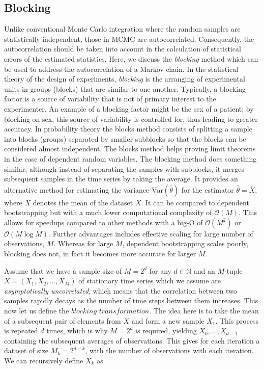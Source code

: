 \subsection{Blocking}\label{sec:blocking}

Unlike conventional Monte Carlo integration where the random samples are statistically independent, those in MCMC are autocorrelated. Consequently, the autocorrelation should be taken into account in the calculation of statistical errors of the estimated statistics. Here, we discuss the \textit{blocking} method \citep{doi:10.1063/1.457480} which can be used to address the autocorrelation of a Markov chain. In the statistical theory of the design of experiments, \textit{blocking} is the arranging of experimental units in groups (blocks) that are similar to one another. Typically, a blocking factor is a source of variability that is not of primary interest to the experimenter. An example of a blocking factor might be the sex of a patient; by blocking on sex, this source of variability is controlled for, thus leading to greater accuracy. In probability theory the blocks method consists of splitting a sample into blocks (groups) separated by smaller subblocks so that the blocks can be considered almost independent. The blocks method helps proving limit theorems in the case of dependent random variables. The blocking method does something similar, although instead of separating the samples with subblocks, it merges subsequent samples in the time series by taking the average. It provides an alternative method for estimating the variance $\text{Var}(\hat{\theta})$ for the estimator $\hat{\theta} = \overline{X}$, where $\overline{X}$ denotes the mean of the dataset $X$. It can be compared to dependent bootstrapping but with a much lower computational complexity of $\mathcal{O}(M)$. This allows for speedups compared to other methods with a big-O of $\mathcal{O}(M^2)$ or $\mathcal{O}(M \log M)$. Further advantages includes effective scaling for large number of observations,  $M$. Whereas for large $M$, dependent bootstrapping scales poorly, blocking does not, in fact it becomes more accurate for larger $M$.  

Assume that we have a sample size of $M = 2^d$ for any $d \in \mathbb{N}$ and an $M$-tuple $X = (X_1, X_2, \dots, X_M)$ of stationary time series which we assume are \textit{asymptotically uncorrelated}, which means that the correlation between two samples rapidly decays as the number of time steps between them increases. This now let us define the $\textit{blocking transformation}$. The idea here is to take the mean of a subsequent pair of elements from $X$ and form a new sample $X_1$. This process is repeated $d$ times, which is why $M=2^d$ is required, yielding $X_0, \dots, X_{d-1}$ containing the subsequent averages of observations. This gives for each iteration a dataset of size $M_k = 2^{d-k}$, with the number of observations with each iteration. We can recursively define $X_k$ as

